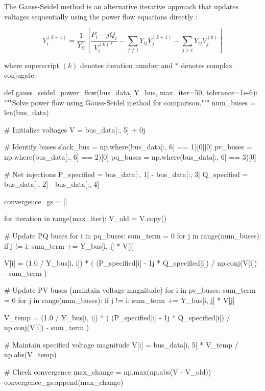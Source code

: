 \documentclass[11pt,a4paper]{article}
\begin{document}
The Gauss-Seidel method is an alternative iterative approach that updates voltages sequentially using the power flow equations directly \cite{VanNess1959,Kusic1986}:

\begin{equation}
V_i^{(k+1)} = \frac{1}{Y_{ii}} \left[ \frac{P_i - jQ_i}{V_i^{(k)*}} - \sum_{j \neq i} Y_{ij} V_j^{(k+1)} - \sum_{j > i} Y_{ij} V_j^{(k)} \right]
\end{equation}

where superscript $(k)$ denotes iteration number and $*$ denotes complex conjugate.

\begin{pycode}
def gauss_seidel_power_flow(bus_data, Y_bus, max_iter=50, tolerance=1e-6):
    """Solve power flow using Gauss-Seidel method for comparison."""
    num_buses = len(bus_data)

    # Initialize voltages
    V = bus_data[:, 5] + 0j

    # Identify buses
    slack_bus = np.where(bus_data[:, 6] == 1)[0][0]
    pv_buses = np.where(bus_data[:, 6] == 2)[0]
    pq_buses = np.where(bus_data[:, 6] == 3)[0]

    # Net injections
    P_specified = bus_data[:, 1] - bus_data[:, 3]
    Q_specified = bus_data[:, 2] - bus_data[:, 4]

    convergence_gs = []

    for iteration in range(max_iter):
        V_old = V.copy()

        # Update PQ buses
        for i in pq_buses:
            sum_term = 0
            for j in range(num_buses):
                if j != i:
                    sum_term += Y_bus[i, j] * V[j]

            V[i] = (1.0 / Y_bus[i, i]) * (
                (P_specified[i] - 1j * Q_specified[i]) / np.conj(V[i]) - sum_term
            )

        # Update PV buses (maintain voltage magnitude)
        for i in pv_buses:
            sum_term = 0
            for j in range(num_buses):
                if j != i:
                    sum_term += Y_bus[i, j] * V[j]

            V_temp = (1.0 / Y_bus[i, i]) * (
                (P_specified[i] - 1j * Q_specified[i]) / np.conj(V[i]) - sum_term
            )

            # Maintain specified voltage magnitude
            V[i] = bus_data[i, 5] * V_temp / np.abs(V_temp)

        # Check convergence
        max_change = np.max(np.abs(V - V_old))
        convergence_gs.append(max_change)


\end{pycode}
\end{document}
